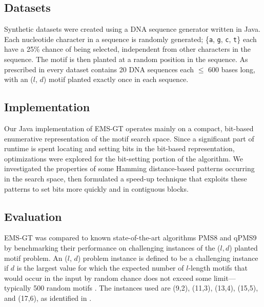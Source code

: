 \documentclass{acm_proc_article-sp}
\begin{document}
	\subsection{Datasets}
		Synthetic datasets were created using a DNA sequence generator written in Java. Each nucleotide character in a sequence is randomly generated; \{\texttt{a}, \texttt{g}, \texttt{c}, \texttt{t}\} each have a 25\% chance of being selected, independent from other characters in the sequence. The motif is then planted at a random position in the sequence. As prescribed in \cite{pevzner2000combinatorial} every dataset contains 20 DNA sequences each $\leq$ 600 bases long, with an ($l$, $d$) motif planted exactly once in each sequence.

	\subsection{Implementation}
		Our Java implementation of EMS-GT operates mainly on a compact, bit-based enumerative representation of the motif search space. Since a significant part of runtime is spent locating and setting bits in the bit-based representation, optimizations were explored for the bit-setting portion of the algorithm. We investigated the properties of some Hamming distance-based patterns occurring in the search space, then formulated a speed-up technique that exploits these patterns to set bits more quickly and in contiguous blocks.

	\subsection{Evaluation}
		EMS-GT was compared to known state-of-the-art algorithms PMS8 and qPMS9 by benchmarking their performance on challenging instances of the ($l, d$) planted motif problem. An ($l$, $d$) problem instance is defined to be a challenging instance if $d$ is the largest value for which the expected number of $l$-length motifs that would occur in the input by random chance does not exceed some limit---typically 500 random motifs \cite{pms2015}. The instances used are (9,2), (11,3), (13,4), (15,5), and (17,6), as identified in \cite{pms2015,pms2007}. 
		\bigskip
\end{document}
